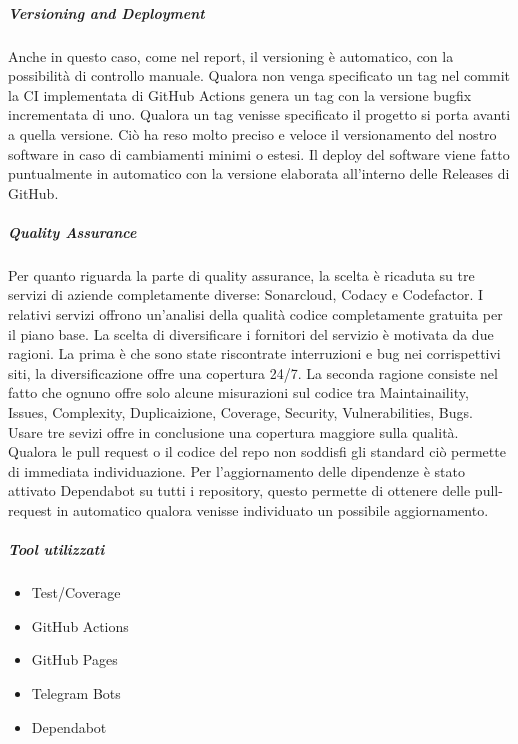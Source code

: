         \subparagraph{Versioning and Deployment} Anche in questo caso, come nel report, il versioning è automatico, con la possibilità di controllo manuale. Qualora non venga specificato un tag nel commit la CI implementata di GitHub Actions genera un tag con la versione bugfix incrementata di uno. Qualora un tag venisse specificato il progetto si porta avanti a quella versione. Ciò ha reso molto preciso e veloce il versionamento del nostro software in caso di cambiamenti minimi o estesi.
        Il deploy del software viene fatto puntualmente in automatico con la versione elaborata all'interno delle Releases di GitHub.
        
        \subparagraph{Quality Assurance}
        Per quanto riguarda la parte di quality assurance, la scelta è ricaduta su tre servizi di aziende completamente diverse: Sonarcloud, Codacy e Codefactor. I relativi servizi offrono un'analisi della qualità codice completamente gratuita per il piano base. La scelta di diversificare i fornitori del servizio è motivata da due ragioni. La prima è che sono state riscontrate interruzioni e bug nei corrispettivi siti, la diversificazione offre una copertura 24/7. La seconda ragione consiste nel fatto che ognuno offre solo alcune misurazioni sul codice tra Maintainaility, Issues, Complexity, Duplicaizione, Coverage, Security, Vulnerabilities, Bugs. Usare tre sevizi offre in conclusione una copertura maggiore sulla qualità. Qualora le pull request o il codice del repo non soddisfi gli standard ciò permette di immediata individuazione. 
        Per l'aggiornamento delle dipendenze è stato attivato Dependabot su tutti i repository, questo permette di ottenere delle pull-request in automatico qualora venisse individuato un possibile aggiornamento.
        
        \subparagraph{Tool utilizzati}
        \begin{itemize}
            \item Test/Coverage
            \item GitHub Actions
            \item GitHub Pages
            \item Telegram Bots
            \item Dependabot
        \end{itemize}








